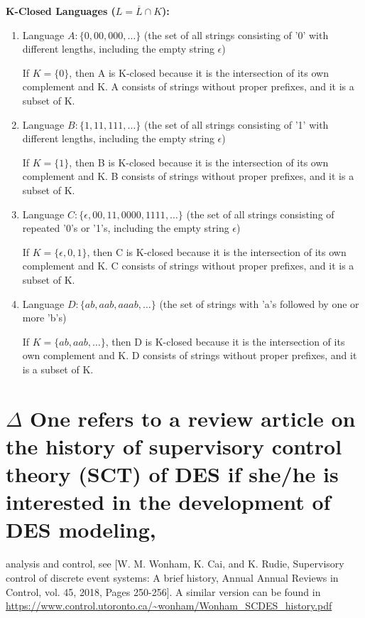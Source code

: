 \documentclass{article}
\begin{document}
\textbf{K-Closed Languages ($L = \overline{L} \cap K$):}

\begin{enumerate}
  \item Language $A: \{0, 00, 000, \ldots\}$ (the set of all strings consisting of '0' with different lengths, including the empty string $\epsilon$)
  
  If $K = \{0\}$, then A is K-closed because it is the intersection of its own complement and K. A consists of strings without proper prefixes, and it is a subset of K.
  
  \item Language $B: \{1, 11, 111, \ldots\}$ (the set of all strings consisting of '1' with different lengths, including the empty string $\epsilon$)
  
  If $K = \{1\}$, then B is K-closed because it is the intersection of its own complement and K. B consists of strings without proper prefixes, and it is a subset of K.

  \item Language $C: \{\epsilon, 00, 11, 0000, 1111, \ldots\}$ (the set of all strings consisting of repeated '0's or '1's, including the empty string $\epsilon$)
  
  If $K = \{\epsilon, 0, 1\}$, then C is K-closed because it is the intersection of its own complement and K. C consists of strings without proper prefixes, and it is a subset of K.

  \item Language $D: \{ab, aab, aaab, \ldots\}$ (the set of strings with 'a's followed by one or more 'b's)
  
  If $K = \{ab, aab, \ldots\}$, then D is K-closed because it is the intersection of its own complement and K. D consists of strings without proper prefixes, and it is a subset of K.

\end{enumerate}

\section{$\Delta $ One refers to a review article on the history of supervisory control theory (SCT) of DES if she/he is interested in the development of DES modeling, }

analysis and control, see [W. M. Wonham, K. Cai, and K. Rudie, Supervisory control of discrete event systems: A brief history, Annual Annual Reviews in Control, vol. 45, 2018, Pages 250-256]. A similar version can be found in \url{https://www.control.utoronto.ca/~wonham/Wonham_SCDES_history.pdf}
\end{document}
